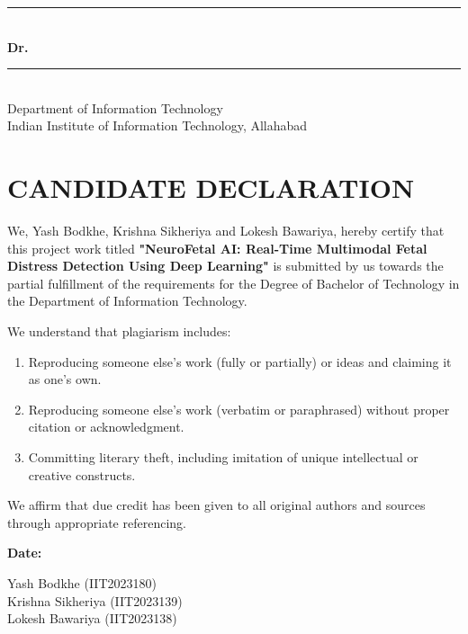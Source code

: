 \documentclass[12pt,a4paper]{report}
\begin{document}
\vspace{4cm}
\begin{flushright}
  \rule{5cm}{0.4pt} \\
  \vspace{0.2cm}
  \textbf{Dr. }\rule{3cm}{0.4pt} \\
  \vspace{0.2cm}
  Department of Information Technology \\
  Indian Institute of Information Technology, Allahabad
\end{flushright}
\clearpage

\chapter*{CANDIDATE DECLARATION}
\vspace{1em}
We, Yash Bodkhe, Krishna Sikheriya and Lokesh Bawariya, hereby certify that this project work titled \textbf{"NeuroFetal AI: Real-Time Multimodal Fetal Distress Detection Using Deep Learning"} is submitted by us towards the partial fulfillment of the requirements for the Degree of Bachelor of Technology in the Department of Information Technology.

We understand that plagiarism includes:
\begin{enumerate}
    \item Reproducing someone else's work (fully or partially) or ideas and claiming it as one's own.
    \item Reproducing someone else's work (verbatim or paraphrased) without proper citation or acknowledgment.
    \item Committing literary theft, including imitation of unique intellectual or creative constructs.
\end{enumerate}

We affirm that due credit has been given to all original authors and sources through appropriate referencing.

\vspace{2cm}
\textbf{Date:}

\vspace{1cm}
\begin{flushleft}
Yash Bodkhe (IIT2023180) \\
Krishna Sikheriya (IIT2023139) \\
Lokesh Bawariya (IIT2023138)
\end{flushleft}
\end{document}
